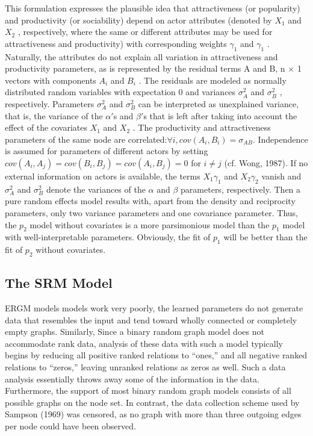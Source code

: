 \documentclass[12pt]{ociamthesis}  %
\begin{document}
	This formulation expresses the plausible idea that attractiveness (or popularity) and productivity (or sociability) depend on actor attributes (denoted by $X_{1}$ and $X_{2}$ , respectively, where the same or different attributes may be used for attractiveness and productivity) with corresponding weights $\gamma_{1}$ and $\gamma_{1}$ . Naturally, the attributes do not explain all variation in attractiveness and productivity parameters, as is represented by the residual terms A and B, n $\times$ 1 vectors with components $A_{i}$ and $B_{i}$ . The residuals are modeled as normally distributed random variables with expectation 0 and variances $\sigma_{A}^{2}$ and $\sigma_{B}^{2}$ , respectively. Parameters $\sigma_{A}^{2}$ and $\sigma_{B}^{2}$ can be interpreted as unexplained variance, that is, the variance of the $\alpha '$s and $\beta '$s that is left after taking into account the effect of the covariates $X_{1}$ and $X_{2}$ . The productivity and attractiveness parameters of the same node are correlated:$\forall i,  cov(A_{i} , B_{i} ) = \sigma_{AB}$. Independence is assumed for parameters of different actors by setting $cov(A_{i} , A_{j} )=cov(B_{i} , B_{j} )=cov(A_{i} , B_{j} ) = 0$ for $i \neq j$ (cf. Wong, 1987). If no external information on actors is available, the terms $X_{1} \gamma_{1}$ and $X_{2} \gamma_{2}$ vanish and $\sigma_{A}^{2}$ and $\sigma_{B}^{2}$ denote the variances of the $\alpha$ and $\beta$ parameters, respectively. Then a pure random effects model results with, apart from the density and reciprocity parameters, only two variance parameters and one covariance parameter. Thus, the $p_{2}$ model without covariates is a more parsimonious model than the $p_{1}$ model with well-interpretable parameters. Obviously, the fit of $p_{1}$ will be better than the fit of $p_{2}$ without covariates.
	
	
	\subsection{The SRM Model}
	
	ERGM models models work very poorly, the learned parameters do not generate data that resembles the input and tend toward wholly connected or completely empty graphs. Similarly, Since a binary random graph model does not accommodate rank data, analysis of these data with such a model typically begins by reducing all positive ranked relations to “ones,” and all negative ranked relations to “zeros,” leaving unranked relations as zeros as well. Such a data analysis essentially throws away some of the information in the data. Furthermore, the support of most binary random graph models consists of all possible graphs on the node set. In contrast, the data collection scheme used by Sampson (1969) was censored, as no graph with more than three outgoing edges per node could have been observed.
	
\end{document}
